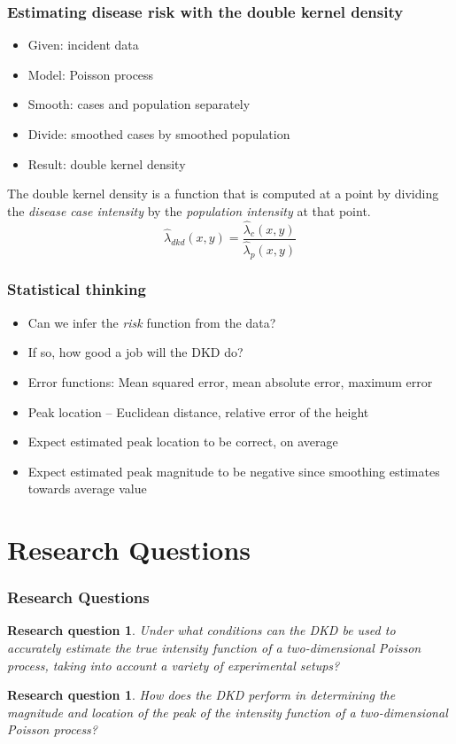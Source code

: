 \documentclass{beamer}
\newtheorem{researchquestion}[theorem]{Research question}
\begin{document}
\begin{frame}\frametitle{Estimating disease risk with the double kernel density}
    \begin{itemize}
        \item Given: incident data
        \item Model: Poisson process
        \item Smooth: cases and population separately
        \item Divide: smoothed cases by smoothed population
        \item Result: double kernel density
    \end{itemize}
    \begin{definition}
        The \alert{double kernel density} is a function that is computed at a point by dividing the \emph{disease case intensity} by the \emph{population intensity} at that point.
        \begin{equation*}
            \hat{\lambda}_{dkd}(x,y) = \frac{ \hat{\lambda}_{c}(x,y) } { \hat{\lambda}_{p}(x,y) }
        \end{equation*}
    \end{definition}
\end{frame}

\begin{frame}\frametitle{Statistical thinking}
    \begin{itemize}
        \item Can we infer the \emph{risk} function from the data?
        \item If so, how good a job will the DKD do?
        \item Error functions: Mean squared error, mean absolute error, maximum error
        \item Peak location -- Euclidean distance, relative error of the height
        \item Expect estimated peak location to be correct, on average
        \item Expect estimated peak magnitude to be \alert{negative} since smoothing estimates towards average value
    \end{itemize}
\end{frame}


\section{Research Questions}
\begin{frame}\frametitle{Research Questions}
    \begin{researchquestion}
        Under what conditions can the DKD be used to accurately estimate the true intensity function of a two-dimensional Poisson process, taking into account a variety of experimental setups?
    \end{researchquestion}
    \begin{researchquestion}
        How does the DKD perform in determining the magnitude and location of the peak of the intensity function of a two-dimensional Poisson process?
    \end{researchquestion}
\end{frame}
\end{document}
